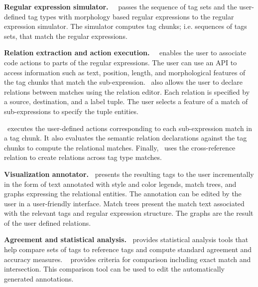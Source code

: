 {\bf Regular expression simulator.~}
\framework~passes the sequence of tag sets and the user-defined 
tag types with morphology based regular expressions to the regular expression 
simulator. 
The simulator computes tag chunks; i.e. sequences of tags sets, that match the 
regular expressions. 

{\bf Relation extraction and action execution.~}
\framework~enables the user to associate code actions to parts of the regular
expressions. 
The user can use an API to access information such as 
text, position, length, and morphological features of the tag chunks that 
match the sub-expression. 
\framework~also allows the user to declare relations between
matches using the relation editor. 
Each relation is specified by a source, destination, and a label tuple. 
The user selects a feature of a match of sub-expressions to specify the 
tuple entities. 

\framework~executes the user-defined actions corresponding to each 
sub-expression match in a tag chunk. 
It also evaluates the semantic relation declarations against the 
tag chunks to compute the relational matches. 
Finally, \framework~uses the  cross-reference relation 
to create relations across tag type matches. 

{\bf Visualization annotator.~}
\framework presents the resulting tags to the user incrementally in the form of 
text annotated with style and color legends, match trees, and graphs expressing
the relational entities. 
The annotation can be edited by the user in a user-friendly interface. 
Match trees present the match text associated with the relevant tags 
and regular expression structure. 
The graphs are the result of the user defined relations.

{\bf Agreement and statistical analysis.~}
\framework provides statistical analysis tools that help compare sets 
of tags to reference tags and compute standard agreement and accuracy measures. 
\framework~ provides criteria for comparison including exact match and intersection. 
This comparison tool can be used to edit the automatically generated annotations. 
